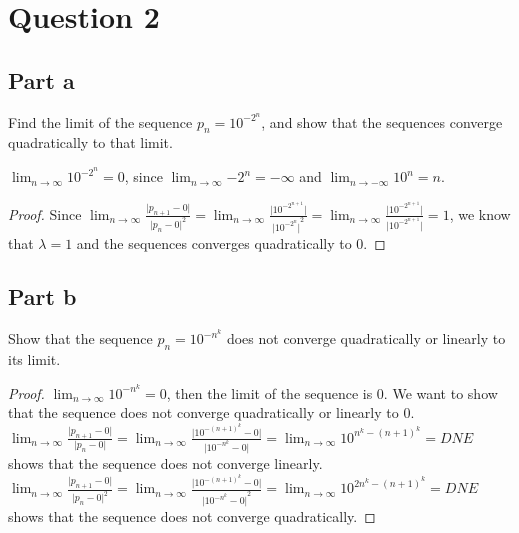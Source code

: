 \section{Question 2}

\subsection{Part a}

\begin{question}
    Find the limit of the sequence $p_n = 10^{-2^n}$, and show that the sequences converge quadratically to that limit.
\end{question}

\begin{answer}
    $\lim_{n \to \infty}{10^{-2^n}} = 0$, since $\lim_{n \to \infty}{-2^n} = -\infty$ and $\lim_{n \to -\infty}{10^n} = n$.
    
    \begin{proof}
        Since $\lim_{n \to \infty}{\tfrac{\lvert p_{n+1} - 0 \rvert}{{\lvert p_n - 0 \rvert}^2}} = \lim_{n \to \infty}{\tfrac{\lvert 10^{-2^{n+1}} \rvert}{{\lvert 10^{-2^{n}}\rvert}^2}} = \lim_{n \to \infty}{\tfrac{\lvert 10^{-2^{n+1}} \rvert}{\lvert 10^{-2^{n+1}}\rvert}} = 1$, we know that $\lambda = 1$ and the sequences converges quadratically to $0$.
    \end{proof}
\end{answer}

\subsection{Part b}

\begin{question}
    Show that the sequence $p_n = 10^{-n^k}$ does not converge quadratically or linearly to its limit.
\end{question}
    
\begin{answer}
    \begin{proof}
        $\lim_{n \to \infty}{10^{-n^k}} = 0$, then the limit of the sequence is $0$. We want to show that the sequence does not converge quadratically or linearly to $0$. $\lim_{n \to \infty}{\tfrac{\lvert p_{n+1} - 0 \rvert}{\lvert p_n - 0 \rvert}} = \lim_{n \to \infty}{\tfrac{\lvert 10^{-{(n+1)}^k} - 0 \rvert}{\lvert 10^{-n^k} - 0 \rvert}} = \lim_{n \to \infty}{10^{n^k - {(n+1)}^k}} = DNE$ shows that the sequence does not converge linearly. $\lim_{n \to \infty}{\tfrac{\lvert p_{n+1} - 0 \rvert}{{\lvert p_n - 0 \rvert}^2}} = \lim_{n \to \infty}{\tfrac{\lvert 10^{-{(n+1)}^k} - 0 \rvert}{{\lvert 10^{-n^k} - 0 \rvert}^2}} = \lim_{n \to \infty}{10^{2n^k - {(n+1)}^k}} = DNE$ shows that the sequence does not converge quadratically.
        
    \end{proof}
\end{answer}